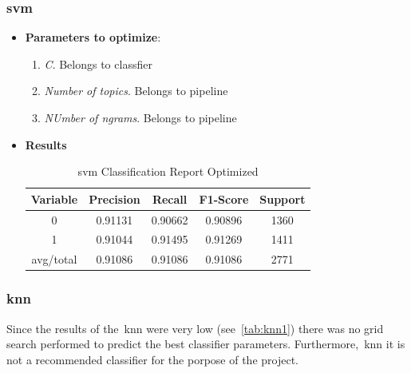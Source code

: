 \subsubsection{\acl{svm}}
\begin{itemize}
	\item \textbf{Parameters to optimize}:
	\begin{enumerate}
		\item \textit{C}. Belongs to classfier
		\item \textit{Number of topics}. Belongs to pipeline
		\item \textit{NUmber of ngrams}. Belongs to pipeline
		
	\end{enumerate}
	\item \textbf{Results}
	\begin{table}[h!]
		\centering
		\begin{tabular}{||c c c c c||} 
			\hline
			Variable & Precision & Recall & F1-Score & Support \\ [0.5ex] 
			\hline\hline
			0 & 0.91131 & 0.90662 & 0.90896 & 1360 \\ 
			1 & 0.91044 & 0.91495 & 0.91269 & 1411 \\
			avg/total & 0.91086 & 0.91086 & 0.91086 & 2771 \\
			[1ex] 
			\hline
		\end{tabular}
		\caption{\acl{svm} Classification Report Optimized}
		\label{tab:sv2}
	\end{table}
	
\end{itemize}
\subsubsection{\acl{knn}}
Since the results of the~\ac{knn} were very low (see~\cref{tab:knn1}) there was no grid search performed to predict the best classifier parameters. Furthermore,~\ac{knn} it is not a recommended classifier for the porpose of the project.
